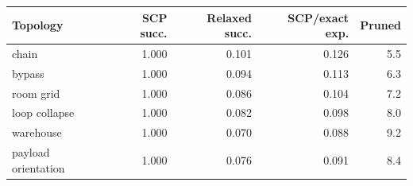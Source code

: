 \begin{tabular}{lrrrr}
\toprule
Topology & SCP succ. & Relaxed succ. & SCP/exact exp. & Pruned \\
\midrule
chain & 1.000 & 0.101 & 0.126 & 5.5 \\
bypass & 1.000 & 0.094 & 0.113 & 6.3 \\
room grid & 1.000 & 0.086 & 0.104 & 7.2 \\
loop collapse & 1.000 & 0.082 & 0.098 & 8.0 \\
warehouse & 1.000 & 0.070 & 0.088 & 9.2 \\
payload orientation & 1.000 & 0.076 & 0.091 & 8.4 \\
\bottomrule
\end{tabular}
